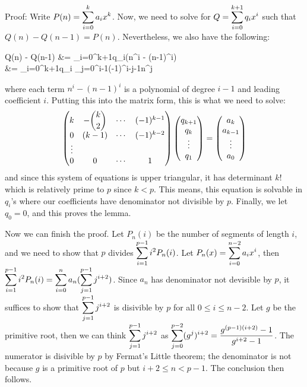 \documentclass[11pt,a4paper]{article}
\begin{document}
\begin{enumerate}
	Proof: Write $P(n) = \displaystyle\sum_{i=0}^k a_ix^{k}$. Now, we need to solve for $Q=\displaystyle\sum_{i=0}^{k+1}q_ix^i$ such that $Q(n)-Q(n-1) = P(n)$. Nevertheless, we also have the following: 
	\begin{flalign*}
		Q(n) - Q(n-1)
		&= \dsum_{i=0}^{k+1}q_i(n^i - (n-1)^i)
		\\&= \dsum_{i=0}^{k+1}q_i \dsum_{j=0^{i-1}}(-1)^{i-j-1}n^j
	\end{flalign*}
	where each term $n^i-(n-1)^i$ is a polynomial of degree $i-1$ and leading coefficient $i$. 
	Putting this into the matrix form, this is what we need to solve: 
	\[
	\begin{pmatrix}
		k & -\dbinom{k}{2} & \cdots & (-1)^{k-1}\\
		0 & (k-1) & \cdots & (-1)^{k-2}\\
		\vdots\\
		0 & 0 & \cdots & 1\\
	\end{pmatrix}
	\begin{pmatrix}
		q_{k+1} \\ q_{k} \\ \vdots \\ q_1\\
	\end{pmatrix}
	=
	\begin{pmatrix}
	a_{k} \\ a_{k-1} \\ \vdots \\ a_0\\
	\end{pmatrix}
	\]
	and since this system of equations is upper triangular, it has determinant $k!$ which is relatively prime to $p$ since $k<p$. This means, this equation is solvable in $q_i$'s where our coefficients have denominator not divisible by $p$. Finally, we let $q_0=0$, and this proves the lemma. 
	
	Now we can finish the proof. Let $P_n(i)$ be the number of segments of length $i$, and we need to show that $p$ divides $\displaystyle\sum_{i=1}^{p-1} i^2P_n(i)$. 
	Let $P_n(x) = \displaystyle\sum_{i=0}^{n-2} a_ix^i$, then $\displaystyle\sum_{i=1}^{p-1} i^2P_n(i) = \displaystyle\sum_{i=0}^{n} a_n (\displaystyle\sum_{j=1}^{p-1} j^{i+2})$. 
	Since $a_n$ has denominator not devisible by $p$, it suffices to show that $\displaystyle\sum_{j=1}^{p-1} j^{i+2}$ is disivible by $p$ for all $0\le i\le n-2$. Let $g$ be the primitive root, then we can think $\displaystyle\sum_{j=1}^{p-1} j^{i+2}$ as $\displaystyle\sum_{j=0}^{p-2} (g^j)^{i+2}=\dfrac{g^{(p-1)(i+2)}-1}{g^{i+2}-1}$. 
	The numerator is disivible by $p$ by Fermat's Little theorem; the denominator is not because $g$ is a primitive root of $p$ but $i+2\le n<p-1$. The conclusion then follows. 
	

\end{enumerate}
\end{document}
